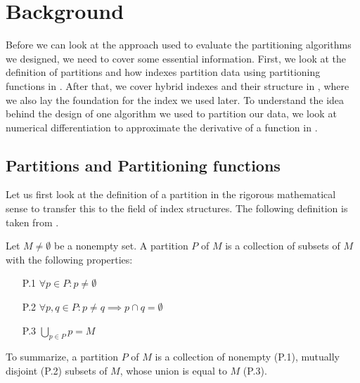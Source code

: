 \thispagestyle{plain}
\chapter{Background}\label{sec:background}

Before we can look at the approach used to evaluate the partitioning algorithms we designed, we need to cover some essential information. First, we look at the definition of partitions and how indexes partition data using partitioning functions in . After that, we cover hybrid indexes and their structure in , where we also lay the foundation for the index we used later. To understand the idea behind the design of one algorithm we used to partition our data, we look at numerical differentiation to approximate the derivative of a function in .

\section{Partitions and Partitioning functions}\label{bg:partitions}
Let us first look at the definition of a partition in the rigorous mathematical sense to transfer this to the field of index structures. The following definition is taken from \citeauthor{Lucas1990} \cite{Lucas1990}.

\vspace{0.5cm}
\begin{definition}[Partition]
Let $M \neq \emptyset$ be a nonempty set. A partition $P$ of $M$ is a collection of subsets of $M$ with the following properties:

\begin{enumerate}
    \item[P.1] $\forall p \in P: p \neq \emptyset$
    \item[P.2] $\forall p,q \in P: p \neq q \implies p \cap q = \emptyset$
    \item[P.3] $\bigcup_{p \in P} p = M$
\end{enumerate}

\noindent To summarize, a partition $P$ of $M$ is a collection of nonempty (P.1), mutually disjoint (P.2) subsets of $M$, whose union is equal to $M$ (P.3).
\end{definition}

